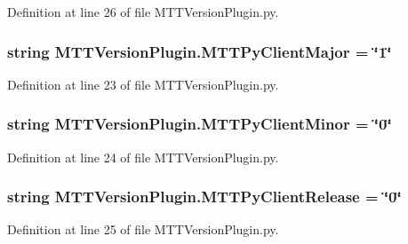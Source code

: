 Definition at line 26 of file M\-T\-T\-Version\-Plugin.\-py.

\hypertarget{namespace_m_t_t_version_plugin_a51adbd87756e59f2189831112aad767e}{
\subsubsection[{M\-T\-T\-Py\-Client\-Major}]{\setlength{\rightskip}{0pt plus 5cm}string M\-T\-T\-Version\-Plugin.\-M\-T\-T\-Py\-Client\-Major = \char`\"{}1\char`\"{}}}\label{namespace_m_t_t_version_plugin_a51adbd87756e59f2189831112aad767e}


Definition at line 23 of file M\-T\-T\-Version\-Plugin.\-py.

\hypertarget{namespace_m_t_t_version_plugin_aa431ead037b1e7329d119bc1e4017ced}{
\subsubsection[{M\-T\-T\-Py\-Client\-Minor}]{\setlength{\rightskip}{0pt plus 5cm}string M\-T\-T\-Version\-Plugin.\-M\-T\-T\-Py\-Client\-Minor = \char`\"{}0\char`\"{}}}\label{namespace_m_t_t_version_plugin_aa431ead037b1e7329d119bc1e4017ced}


Definition at line 24 of file M\-T\-T\-Version\-Plugin.\-py.

\hypertarget{namespace_m_t_t_version_plugin_ae6cedc84f8ae714487299ccdc4403a10}{
\subsubsection[{M\-T\-T\-Py\-Client\-Release}]{\setlength{\rightskip}{0pt plus 5cm}string M\-T\-T\-Version\-Plugin.\-M\-T\-T\-Py\-Client\-Release = \char`\"{}0\char`\"{}}}\label{namespace_m_t_t_version_plugin_ae6cedc84f8ae714487299ccdc4403a10}


Definition at line 25 of file M\-T\-T\-Version\-Plugin.\-py.

